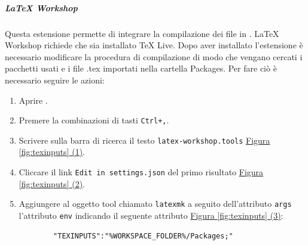 \subparagraph{LaTeX Workshop}
Questa estensione permette di integrare la compilazione dei file  in .
LaTeX Workshop richiede che sia installato TeX Live.
Dopo aver installato l'estensione è necessario modificare la procedura di compilazione di modo che vengano cercati i pacchetti usati e i file .tex importati nella cartella Packages.
Per fare ciò è necessario seguire le azioni:
\begin{enumerate}
    \item Aprire .
    
    \item Premere la combinazioni di tasti \texttt{Ctrl+,}.
    
    \item Scrivere sulla barra di ricerca il testo \texttt{latex-workshop.tools} \hyperref[fig:texinputs]{Figura \ref{fig:texinputs} (1)}.
    
    \item Cliccare il link \texttt{Edit in settings.json} del primo risultato \hyperref[fig:texinputs]{Figura \ref{fig:texinputs} (2)}.
    
    \item Aggiungere al oggetto tool chiamato \texttt{latexmk} a seguito dell'attributo \texttt{args} l'attributo \texttt{env} indicando il seguente attributo \hyperref[fig:texinputs]{Figura \ref{fig:texinputs} (3)}: 
    \begin{lstlisting}
        "TEXINPUTS":"%WORKSPACE_FOLDER%/Packages;"
    \end{lstlisting}
\end{enumerate}

